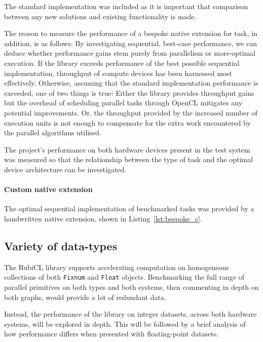 The standard implementation was included as it is important that comparison between any new solutions and existing functionality is made.

The reason to measure the performance of a bespoke native extension for task, in addition, is as follows:
By investigating sequential, best-case performance, we can deduce whether performance gains stem purely from parallelism or more-optimal execution. If the library exceeds performance of the best possible sequential implementation, throughput of compute devices has been harnessed most effectively. Otherwise, assuming that the standard implementation performance is exceeded, one of two things is true: Either the library provides throughput gains but the overhead of scheduling parallel tasks through \ac{OpenCL} mitigates any potential improvements. Or, the throughput provided by the increased number of execution units is not enough to compensate for the extra work encountered by the parallel algorithms utilised.

The project's performance on both hardware devices present in the test system was measured so that the relationship between the type of task and the optimal device architecture can be investigated.

\paragraph*{Custom native extension}
The optimal sequential implementation of benchmarked tasks was provided by a handwritten native extension, shown in Listing~\ref{lst:bespoke_c}.


\subsection{Variety of data-types}
The RubiCL library supports accelerating computation on homogeneous collections of both \verb|Fixnum| and \verb|Float| objects.
Benchmarking the full range of parallel primitives on both types and both systems, then commenting in depth on both graphs, would provide a lot of redundant data.

Instead, the performance of the library on integer datasets, across  both hardware systems, will be explored in depth.
This will be followed by a brief analysis of how performance differs when presented with floating-point datasets.


